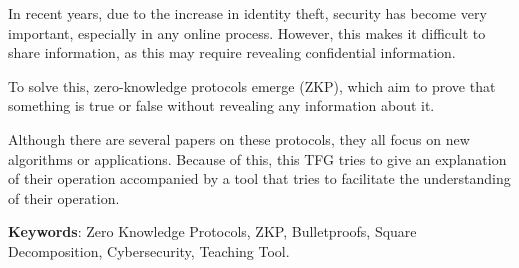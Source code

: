 In recent years, due to the increase in identity theft, security has become very important, especially in any online process. However, this makes it difficult to share information, as this may require revealing confidential information.

To solve this, zero-knowledge protocols emerge (ZKP), which aim to prove that something is true or false without revealing any information about it.

Although there are several papers on these protocols, they all focus on new algorithms or applications. Because of this, this TFG tries to give an explanation of their operation accompanied by a tool that tries to facilitate the understanding of their operation.

\vfill

\textbf{Keywords}: Zero Knowledge Protocols, ZKP, Bulletproofs, Square Decomposition, Cybersecurity, Teaching Tool.

\blankpage